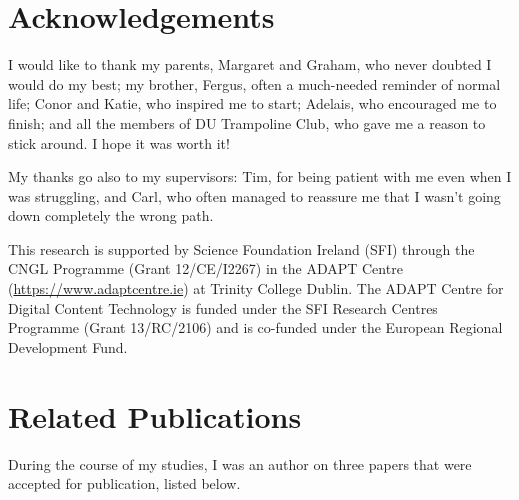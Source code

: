 \documentclass[a4paper,12pt,leqno]{article}
\begin{document}
\newpage
\section*{Acknowledgements}

I would like to thank my parents, Margaret and Graham, who never doubted I would do my best; my brother, Fergus, often a much-needed reminder of normal life; Conor and Katie, who inspired me to start; Adelais, who encouraged me to finish; and all the members of DU Trampoline Club, who gave me a reason to stick around. I hope it was worth it!

My thanks go also to my supervisors: Tim, for being patient with me even when I was struggling, and Carl, who often managed to reassure me that I wasn't going down completely the wrong path.

This research is supported by Science Foundation Ireland (SFI) through the CNGL 
Programme (Grant 12/CE/I2267) in the ADAPT Centre 
(\url{https://www.adaptcentre.ie}) at Trinity College Dublin. The
ADAPT Centre for Digital Content Technology is funded under the SFI Research 
Centres Programme (Grant 13/RC/2106) and is co-funded under the European 
Regional Development Fund.


\newpage
\section*{Related Publications}
During the course of my studies, I was an author on three papers that were accepted for publication, listed below.
\end{document}
